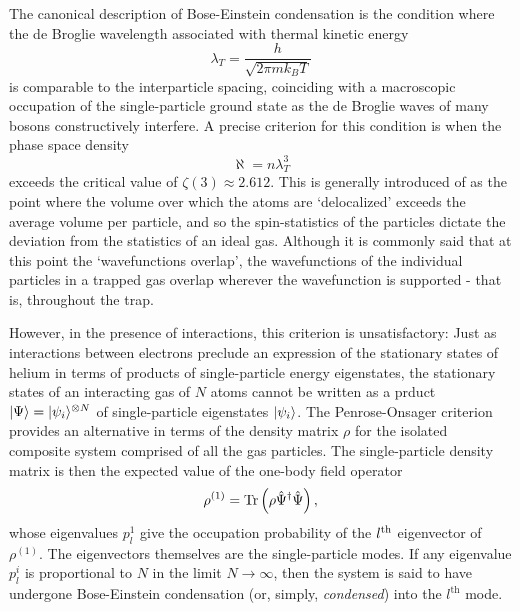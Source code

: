	The canonical description of Bose-Einstein condensation is the condition where the de Broglie wavelength associated with thermal kinetic energy
	\begin{equation}
		\lambda_T = \frac{h}{\sqrt{2\pi m k_B T}}
	\end{equation}
	is comparable to the interparticle spacing, coinciding with a macroscopic occupation of the single-particle ground state as the de Broglie waves of many bosons constructively interfere.
	A precise criterion for this condition is when the phase space density
	\begin{equation}
		\aleph = n \lambda_T^3
	\end{equation}
	exceeds the critical value of $\zeta(3)\approx2.612$. 
	This is generally introduced of as the point where the volume over which the atoms are `delocalized'  exceeds the average volume per particle, and so the spin-statistics of the particles dictate the deviation from the statistics of an ideal gas.
	Although it is commonly said that at this point the `wavefunctions overlap', the wavefunctions of the individual particles in a trapped gas overlap wherever the wavefunction is supported - that is, throughout the trap.

	
	However, in the presence of interactions, this criterion is unsatisfactory: Just as interactions between electrons preclude an expression of the stationary states of helium in terms of products of single-particle energy eigenstates, the stationary states of an interacting gas of $N$ atoms cannot be written as a prduct $|\Psi\rangle = |\psi_i\rangle^{\otimes N}$ of single-particle eigenstates $|\psi_i\rangle$.
	The Penrose-Onsager criterion \cite{penrose56} provides an alternative in terms of the density matrix $\rho$ for the isolated composite system comprised of all the gas particles.
	The single-particle density matrix is then the expected value of the one-body field operator
	\begin{equation}
		\rho^{(1)} = \textrm{Tr}\left(\rho\hat{\Psi}^\dagger\hat{\Psi}\right),
	\end{equation}
	whose eigenvalues $p_{l}^{1}$ give the occupation probability of the $l^{\rm th}$ eigenvector of $\rho^{(1)}$.
	The eigenvectors themselves are the single-particle modes.
	If any eigenvalue $p_{l}^{i}$ is proportional to $N$ in the limit $N\rightarrow\infty$, then the system is said to have undergone Bose-Einstein condensation (or, simply, \emph{condensed}) into the $l^\textrm{th}$ mode.
	

